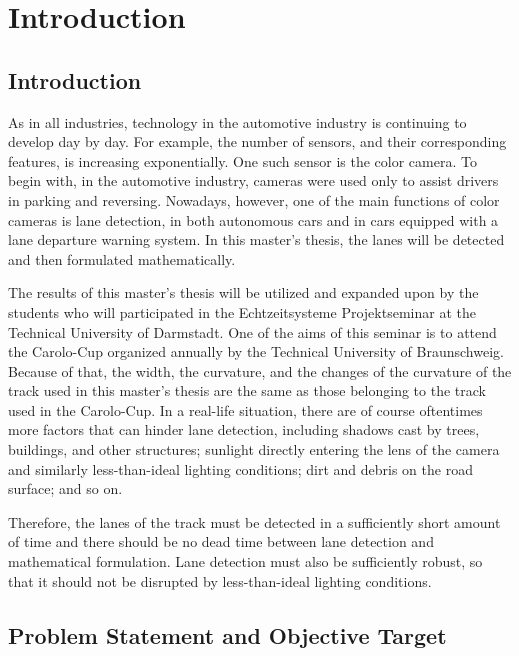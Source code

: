 
\chapter{Introduction}\label{cha:Intro}

\section{Introduction}\label{sec:Introduction}

As in all industries, technology in the automotive industry is continuing to develop 
day by day. For example, the number of sensors, and their corresponding features, is 
increasing exponentially. One such sensor is the color camera. To begin with, in the 
automotive industry, cameras were used only to assist drivers in parking and reversing. 
Nowadays, however, one of the main functions of color cameras is lane detection, in both 
autonomous cars and in cars equipped with a lane departure warning system. In this 
master's thesis, the lanes will be detected and then formulated mathematically.

The results of this master's thesis will be utilized and expanded upon by the students 
who will participated in the Echtzeitsysteme Projektseminar at the Technical University 
of Darmstadt. One of the aims of this seminar is to attend the Carolo-Cup organized 
annually by the Technical University of Braunschweig. Because of that, the width, the 
curvature, and the changes of the curvature of the track used in this master's thesis 
are the same as those belonging to the track used in the Carolo-Cup. In a real-life 
situation, there are of course oftentimes more factors that can hinder lane detection, 
including shadows cast by trees, buildings, and other structures; sunlight directly 
entering the lens of the camera and similarly less-than-ideal lighting conditions; 
dirt and debris on the road surface; and so on.

Therefore, the lanes of the track must be detected in a sufficiently short amount of 
time and there should be no dead time between lane detection and mathematical 
formulation. Lane detection must also be sufficiently robust, so that it should not be 
disrupted by less-than-ideal lighting conditions.

\section{Problem Statement and Objective Target}\label{sec:Problem Statement and Objective Target}


